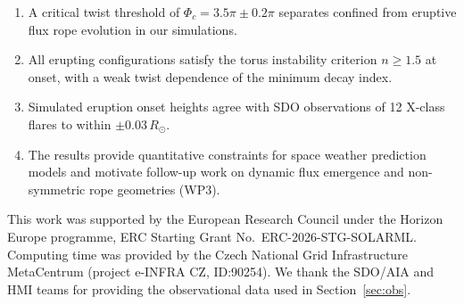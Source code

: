 \documentclass[twocolumn]{aastex631}
\begin{document}
\begin{enumerate}
\item A critical twist threshold of $\Phi_c = 3.5\pi \pm 0.2\pi$ separates confined
  from eruptive flux rope evolution in our simulations.
\item All erupting configurations satisfy the torus instability criterion
  $n \geq 1.5$ at onset, with a weak twist dependence of the minimum decay index.
\item Simulated eruption onset heights agree with SDO observations of 12 X-class
  flares to within $\pm 0.03\,R_\odot$.
\item The results provide quantitative constraints for space weather prediction
  models and motivate follow-up work on dynamic flux emergence and non-symmetric
  rope geometries (WP3).
\end{enumerate}

\begin{acknowledgments}
This work was supported by the European Research Council under the Horizon Europe
programme, ERC Starting Grant No.~ERC-2026-STG-SOLARML. Computing time was
provided by the Czech National Grid Infrastructure MetaCentrum (project
e-INFRA CZ, ID:90254). We thank the SDO/AIA and HMI teams for providing
the observational data used in Section~\ref{sec:obs}.
\end{acknowledgments}




\end{document}

